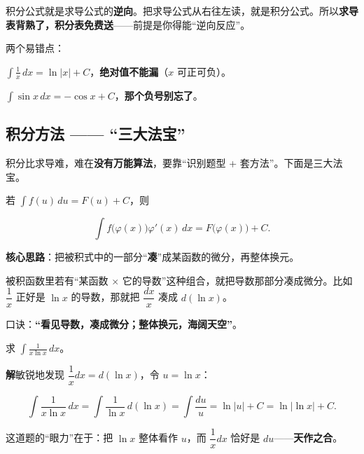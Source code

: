 \documentclass[11pt,a4paper]{article}
\newcommand{\keyw}[1]{\colorbox{cYellowL}{\textbf{\color{cOrange}#1}}}
\begin{document}
\begin{tipbox}[记忆诀窍：积分表 = 导数表“反过来”]
积分公式就是求导公式的\keyw{逆向}。把求导公式从右往左读，就是积分公式。所以\textbf{求导表背熟了，积分表免费送}——前提是你得能“逆向反应”。

两个易错点：
\begin{pkdot}
  \item $\displaystyle\int\frac{1}{x}\,dx=\ln|x|+C$，\textbf{绝对值不能漏}（$x$ 可正可负）。
  \item $\displaystyle\int\sin x\,dx=-\cos x+C$，\textbf{那个负号别忘了}。
\end{pkdot}
\end{tipbox}

\newpage
\subsection{积分方法 —— “三大法宝”}

积分比求导难，难在\textbf{没有万能算法}，要靠“识别题型 + 套方法”。下面是三大法宝。

\begin{tipbox}
若 $\int f(u)\,du=F(u)+C$，则
\begin{eqbox}\[ \int f\big(\varphi(x)\big)\varphi'(x)\,dx = F\big(\varphi(x)\big)+C. \]\end{eqbox}
\textbf{核心思路}：把被积式中的一部分“\keyw{凑}”成某函数的微分，再整体换元。
\end{tipbox}

\begin{plainbox}[白话解读：凑微分 = “看顺眼”]
被积函数里若有“某函数 $\times$ 它的导数”这种组合，就把导数那部分凑成微分。比如 $\dfrac{1}{x}$ 正好是 $\ln x$ 的导数，那就把 $\dfrac{dx}{x}$ 凑成 $d(\ln x)$。

口诀：\keyw{“看见导数，凑成微分；整体换元，海阔天空”}。
\end{plainbox}

\begin{egbox}[凑微分法]
求 $\displaystyle\int \frac{1}{x\ln x}\,dx$。

\textbf{解}\quad 敏锐地发现 $\dfrac{1}{x}dx=d(\ln x)$，令 $u=\ln x$：
\begin{eqbox}\[ \int \frac{1}{x\ln x}\,dx=\int \frac{1}{\ln x}\,d(\ln x)=\int \frac{du}{u}=\ln|u|+C=\boxed{\ln|\ln x|+C}. \]\end{eqbox}
这道题的“眼力”在于：把 $\ln x$ 整体看作 $u$，而 $\dfrac{1}{x}dx$ 恰好是 $du$——\keyw{天作之合}。
\end{egbox}
\end{document}
